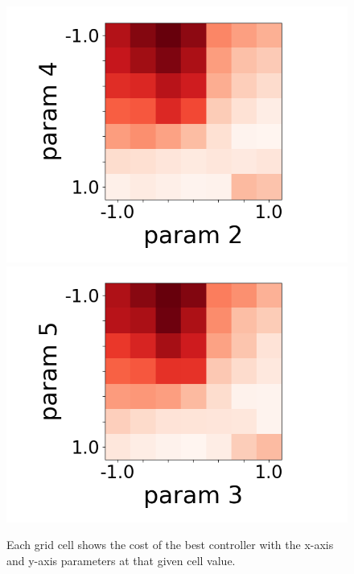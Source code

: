 \documentclass[conference]{IEEEtran}
\begin{document}
\begin{figure}[H]
      \includegraphics[width=0.29\linewidth]{./images/2_4_grid_img.png}
      \includegraphics[width=0.29\linewidth]{./images/3_5_grid_img.png}
      \caption{Each grid cell shows the cost of the best controller with the x-axis and y-axis parameters at that given cell value.}
    \end{figure}
\end{document}
